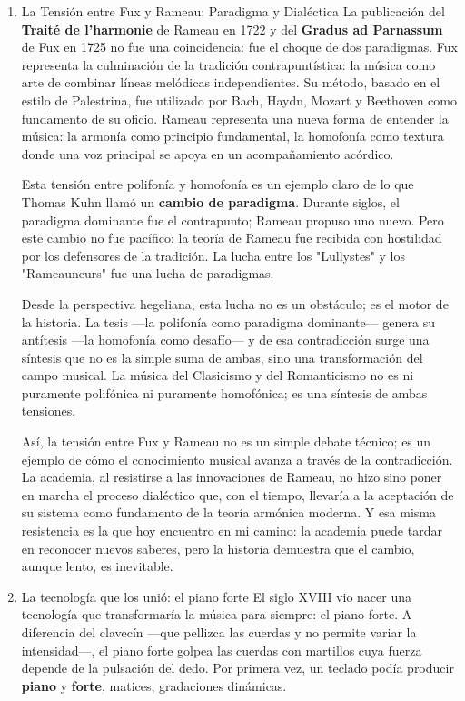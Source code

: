 \documentclass[14pt, a4paper]{article}
\begin{document}
\begin{enumerate}
\begin{verbatim}
~progresion_rameau.play;
)
\end{verbatim}
\item La Tensión entre Fux y Rameau: Paradigma y Dialéctica
\label{tension-fux-rameau}
La publicación del \textbf{Traité de l'harmonie} de Rameau en 1722 y del
\textbf{Gradus ad Parnassum} de Fux en 1725 no fue una coincidencia: fue el
choque de dos paradigmas. Fux representa la culminación de la
tradición contrapuntística: la música como arte de combinar líneas
melódicas independientes. Su método, basado en el estilo de
Palestrina, fue utilizado por Bach, Haydn, Mozart y Beethoven como
fundamento de su oficio. Rameau representa una nueva forma de entender
la música: la armonía como principio fundamental, la homofonía como
textura donde una voz principal se apoya en un acompañamiento
acórdico.

Esta tensión entre polifonía y homofonía es un ejemplo claro de lo que
Thomas Kuhn llamó un \textbf{cambio de paradigma}. Durante siglos, el
paradigma dominante fue el contrapunto; Rameau propuso uno nuevo. Pero
este cambio no fue pacífico: la teoría de Rameau fue recibida con
hostilidad por los defensores de la tradición. La lucha entre los
"Lullystes" y los "Rameauneurs" fue una lucha de paradigmas.

Desde la perspectiva hegeliana, esta lucha no es un obstáculo; es el
motor de la historia. La tesis —la polifonía como paradigma
dominante— genera su antítesis —la homofonía como desafío— y de esa
contradicción surge una síntesis que no es la simple suma de ambas,
sino una transformación del campo musical. La música del Clasicismo y
del Romanticismo no es ni puramente polifónica ni puramente
homofónica; es una síntesis de ambas tensiones.

Así, la tensión entre Fux y Rameau no es un simple debate técnico; es
un ejemplo de cómo el conocimiento musical avanza a través de la
contradicción. La academia, al resistirse a las innovaciones de
Rameau, no hizo sino poner en marcha el proceso dialéctico que, con el
tiempo, llevaría a la aceptación de su sistema como fundamento de la
teoría armónica moderna. Y esa misma resistencia es la que hoy
encuentro en mi camino: la academia puede tardar en reconocer nuevos
saberes, pero la historia demuestra que el cambio, aunque lento, es
inevitable.
\item La tecnología que los unió: el piano forte
\label{piano-forte}
El siglo XVIII vio nacer una tecnología que transformaría la música
para siempre: el piano forte. A diferencia del clavecín —que pellizca
las cuerdas y no permite variar la intensidad—, el piano forte
golpea las cuerdas con martillos cuya fuerza depende de la pulsación
del dedo. Por primera vez, un teclado podía producir \textbf{piano} y \textbf{forte},
matices, gradaciones dinámicas.


\end{enumerate}
\end{document}
